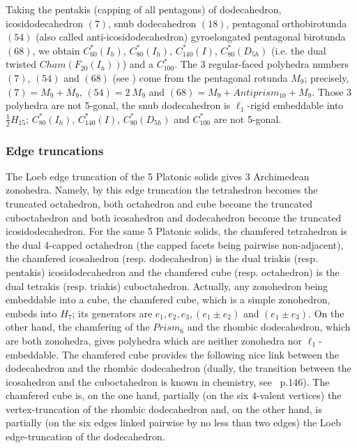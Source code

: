 \begin{remark}
Taking the pentakis (capping of all pentagons) of
dodecahedron, icosidodecahedron $(7)$, snub dodecahedron $(18)$, pentagonal orthobirotunda $(54)$ (also called anti-icosi\-dode\-ca\-he\-dron)
gyroelongated pentagonal birotunda $(68)$, we obtain $C^*_{60}(I_h)$, $C^*_{80}(I_h)$,
$C^*_{140}(I)$, $C^*_{80}(D_{5h})$ (i.e. the dual twisted $Cham(F_{20}(I_h))$) 
and a $C^*_{100}$.
The 3 regular-faced polyhedra numbers $(7)$, $(54)$ and $(68)$ (see \cite{b71})
come from the pentagonal rotunda $M_{9}$; precisely, $(7)=M_9+\overline{M}_9$,
 $(54)=2\:M_9$ and $(68)=M_9+Antiprism_{10}+M_9$. Those 3 polyhedra are not 5-gonal, 
the snub dodecahedron is $\ell_1$-rigid embeddable into $\frac{1}{2}H_{15}$;
$C^*_{80}(I_h)$, $C^*_{140}(I)$, $C^*_{80}(D_{5h})$ and $C^*_{100}$ are not 5-gonal.
\end{remark}

\subsubsection{Edge truncations}
The Loeb edge truncation of the 5 Platonic solids gives 3 Archimedean
zonohedra. Namely, by this edge truncation the tetrahedron becomes the truncated
octahedron, both octahedron and cube become
the truncated cuboctahedron and both
icosahedron and dodecahedron become the truncated icosidodecahedron.
For the same 5 Platonic solids,
the chamfered tetrahedron is the dual 4-capped octahedron (the capped facets
being pairwise non-adjacent), 
the chamfered icosahedron (resp. dodecahedron) is the dual triakis (resp. pentakis) 
icosidodecahedron and the chamfered cube (resp. octahedron) is the dual tetrakis (resp. triakis) 
cuboctahedron. Actually, any zonohedron being
embeddable into a cube, the chamfered cube, which is a simple zonohedron,
embeds into $H_{7}$; its generators are 
$e_1, e_2, e_3, (e_1\pm e_2)$ and $(e_1\pm e_3)$. 
On the other hand, the chamfering of the $Prism_6$ and the rhombic dodecahedron,
which are both zonohedra, gives polyhedra which are neither zonohedra nor $\ell_1$-embeddable.
The chamfered cube provides the following nice link between the dodecahedron
and the rhombic dodecahedron (dually, the transition between the icosahedron and the 
cuboctahedron is known in chemistry, see~\cite{w84} p.146). The chamfered cube 
is, on the one hand, partially (on the six $4$-valent vertices) the vertex-truncation of the 
rhombic dodecahedron and, on the other hand, is partially (on the six edges linked
pairwise by no less than two edges) the Loeb edge-truncation of the 
dodecahedron. 

